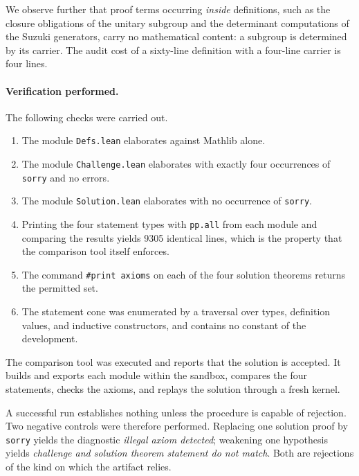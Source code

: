 \documentclass{article}
\begin{document}
We observe further that proof terms occurring \emph{inside} definitions, such as
the closure obligations of the unitary subgroup and the determinant computations
of the Suzuki generators, carry no mathematical content: a subgroup is
determined by its carrier. The audit cost of a sixty-line definition with a
four-line carrier is four lines.

\paragraph{Verification performed.}
The following checks were carried out.
\begin{enumerate}
  \item The module \verb|Defs.lean| elaborates against Mathlib alone.
  \item The module \verb|Challenge.lean| elaborates with exactly four
  occurrences of \verb|sorry| and no errors.
  \item The module \verb|Solution.lean| elaborates with no occurrence of
  \verb|sorry|.
  \item Printing the four statement types with \verb|pp.all| from each module
  and comparing the results yields 9305 identical lines, which is the property
  that the comparison tool itself enforces.
  \item The command \verb|#print axioms| on each of the four solution theorems
  returns the permitted set.
  \item The statement cone was enumerated by a traversal over types, definition
  values, and inductive constructors, and contains no constant of the
  development.
\end{enumerate}
The comparison tool was executed and reports that the solution is accepted. It
builds and exports each module within the sandbox, compares the four statements,
checks the axioms, and replays the solution through a fresh kernel.

A successful run establishes nothing unless the procedure is capable of
rejection. Two negative controls were therefore performed. Replacing one
solution proof by \verb|sorry| yields the diagnostic \emph{illegal axiom
detected}; weakening one hypothesis yields \emph{challenge and solution theorem
statement do not match}. Both are rejections of the kind on which the artifact
relies.
\end{document}
